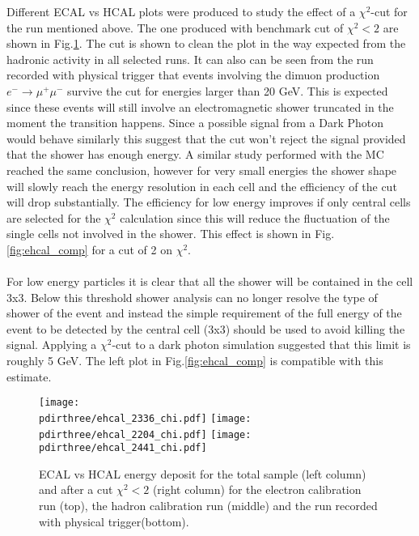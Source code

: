 Different ECAL vs HCAL plots were produced to study the effect of a
$\chi^2$-cut for the run mentioned above. The one produced with
benchmark cut of $\chi^2 < 2$ are shown in
Fig.\ref{fig:ehcal_test}. The cut is shown to clean the plot in the
way expected from the hadronic activity in all selected runs. It can also
can be seen from the run recorded with physical trigger that events involving the dimuon
production $e^- \to \mu^+\mu^-$ survive the cut for energies larger
than 20 GeV.  This is expected since these events will still involve
an electromagnetic shower truncated in the moment the transition
happens. Since a possible signal from a Dark Photon would behave
similarly this suggest that the cut won't reject the signal provided
that the shower has enough energy. A similar study performed with the
MC reached the same conclusion, however for
very small energies the shower shape will slowly reach the energy
resolution in each cell and the efficiency of the cut will drop
substantially.  The efficiency for low energy improves if only central
cells are selected for the $\chi^2$ calculation since this will reduce
the fluctuation of the single cells not involved in the shower. This
effect is shown in Fig.\ref{fig:ehcal_comp} for a cut of 2 on $\chi^2$.
\\
\\
For low energy particles it is clear that all the shower will be
contained in the cell 3x3. Below this threshold shower analysis can no
longer resolve the type of shower of the event and instead the simple
requirement of the full energy of the event to be detected by the
central cell (3x3) should be used to avoid killing the
signal. Applying a $\chi^2$-cut to a dark photon simulation suggested that this limit is roughly 5 GeV.  The
left plot in Fig.\ref{fig:ehcal_comp} is compatible with this
estimate.

\begin{figure}[h!]
  \begin{center}
    \texttt{[image: \\pdirthree/ehcal\_2336\_chi.pdf]}
    \texttt{[image: \\pdirthree/ehcal\_2204\_chi.pdf]}
    \texttt{[image: \\pdirthree/ehcal\_2441\_chi.pdf]}
  \end{center}
  \caption[ECAL vs HCAL energy deposit after a cut $\chi^2$]{ECAL vs HCAL energy deposit for the total sample (left
    column) and after a cut $\chi^2<2$ (right column) for the
    electron calibration run (top), the hadron calibration run (middle) and the run recorded with physical trigger(bottom).}
  \label{fig:ehcal_test}
\end{figure}
\clearpage

